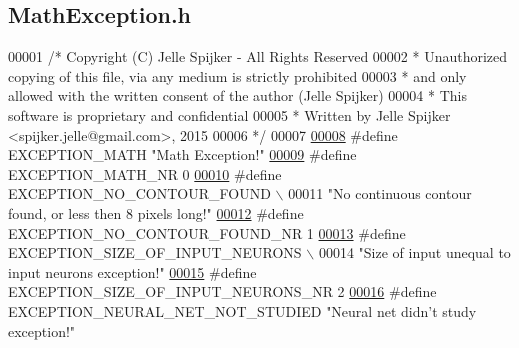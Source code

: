 \hypertarget{_math_exception_8h_source}{}\subsection{Math\+Exception.\+h}
\label{_math_exception_8h_source}

\begin{DoxyCode}
00001 \textcolor{comment}{/* Copyright (C) Jelle Spijker - All Rights Reserved}
00002 \textcolor{comment}{ * Unauthorized copying of this file, via any medium is strictly prohibited}
00003 \textcolor{comment}{ * and only allowed with the written consent of the author (Jelle Spijker)}
00004 \textcolor{comment}{ * This software is proprietary and confidential}
00005 \textcolor{comment}{ * Written by Jelle Spijker <spijker.jelle@gmail.com>, 2015}
00006 \textcolor{comment}{ */}
00007 
\hypertarget{_math_exception_8h_source_l00008}{}\hyperlink{_math_exception_8h_a5c678225d975a600ef77313d82a247b0}{00008} \textcolor{preprocessor}{#define EXCEPTION\_MATH "Math Exception!"}
\hypertarget{_math_exception_8h_source_l00009}{}\hyperlink{_math_exception_8h_a2ad831fc7963b41855b14ace07bbdf84}{00009} \textcolor{preprocessor}{#define EXCEPTION\_MATH\_NR 0}
\hypertarget{_math_exception_8h_source_l00010}{}\hyperlink{_math_exception_8h_a39b49da54ac54198f948ea87cd429c1c}{00010} \textcolor{preprocessor}{#define EXCEPTION\_NO\_CONTOUR\_FOUND                                             \(\backslash\)}
00011 \textcolor{preprocessor}{  "No continuous contour found, or less then 8 pixels long!"}
\hypertarget{_math_exception_8h_source_l00012}{}\hyperlink{_math_exception_8h_a3c2849e602d9d4c0dba3f2d3301d9cbf}{00012} \textcolor{preprocessor}{#define EXCEPTION\_NO\_CONTOUR\_FOUND\_NR 1}
\hypertarget{_math_exception_8h_source_l00013}{}\hyperlink{_math_exception_8h_ab0eb22f73fea0163f06029cbc3f05825}{00013} \textcolor{preprocessor}{#define EXCEPTION\_SIZE\_OF\_INPUT\_NEURONS                                        \(\backslash\)}
00014 \textcolor{preprocessor}{  "Size of input unequal to input neurons exception!"}
\hypertarget{_math_exception_8h_source_l00015}{}\hyperlink{_math_exception_8h_ad3576b2d374be2f14816abdf843432c7}{00015} \textcolor{preprocessor}{#define EXCEPTION\_SIZE\_OF\_INPUT\_NEURONS\_NR 2}
\hypertarget{_math_exception_8h_source_l00016}{}\hyperlink{_math_exception_8h_ac412424987d9143f59b48a2cf9e0c21b}{00016} \textcolor{preprocessor}{#define EXCEPTION\_NEURAL\_NET\_NOT\_STUDIED "Neural net didn't study exception!"}

\end{DoxyCode}
